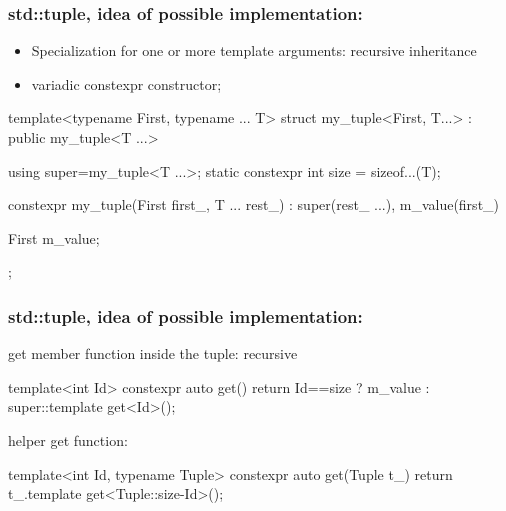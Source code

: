 \documentclass[aspectratio=43]{beamer}
\begin{document}
\begin{frame}[fragile]\frametitle{std::tuple, idea of possible implementation:}

  \begin{itemize}
  \item Specialization for one or more template arguments: \alert{recursive inheritance}
  \item variadic constexpr constructor;
  \end{itemize}
  \begin{Cpplisting}{}
template<typename First, typename ... T>
struct my_tuple<First, T...> : public my_tuple<T ...> {
  using super=my_tuple<T ...>;
  static constexpr int size = sizeof...(T);

  constexpr my_tuple(First first_, T ... rest_) : super(rest_ ...), m_value(first_){}

  First m_value;
};
    \end{Cpplisting}
\end{frame}

\begin{frame}[fragile]\frametitle{std::tuple, idea of possible implementation:}

  get member function inside the tuple:
  recursive
  \begin{Cpplisting}{}
template<int Id>
constexpr auto get(){
  return Id==size ?
         m_value :
         super::template get<Id>();
}
  \end{Cpplisting}
  helper get function:
  \begin{Cpplisting}{}
template<int Id, typename Tuple>
constexpr auto get(Tuple t_){
  return t_.template get<Tuple::size-Id>();
}
  \end{Cpplisting}
\end{frame}

\end{document}
